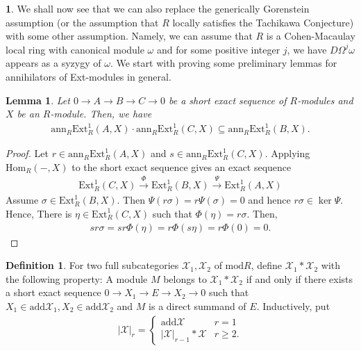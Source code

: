 \documentclass[12pt]{amsart}
\newcommand{\Ext}{\mathrm{Ext}}
\newcommand{\Hom}{\mathrm{Hom}}
\newcommand{\ann}{\mathrm{ann}}
\newcommand{\module}{\mathrm{mod}}
\newcommand{\add}{\mathrm{add}}
\newcommand{\XX}{\mathcal{X}}
\newtheorem{lemma}[theorem]{Lemma}
\theoremstyle{definition}
\newtheorem{definition}[theorem]{Definition}
\newtheorem{chunk}[theorem]{}
\numberwithin{equation}{theorem}
\def\X{\mathcal{X}}
\begin{document}
\begin{chunk}
    We shall now see that we can also replace the generically Gorenstein assumption (or the assumption that $R$ locally satisfies the Tachikawa Conjecture) with some other assumption. Namely, we can assume that $R$ is a Cohen-Macaulay local ring with canonical module $\omega$ and for some positive integer $j$, we have $D \Omega^j \omega$ appears as a syzygy of $\omega$. We start with proving some preliminary lemmas for annihilators of Ext-modules in general. 
    \begin{lemma}\label{general-lemma-for-annihilators}
        Let $0 \to A \to B \to C \to 0$ be a short exact sequence of $R$-modules and $X$ be an $R$-module. Then, we have
        \begin{align*}
            \ann_R\Ext_R^1(A,X) \cdot \ann_R\Ext_R^1(C,X) \subseteq \ann_R\Ext_R^1(B,X).
        \end{align*}
    \end{lemma}
    \begin{proof}
            Let $r\in \ann_R\Ext_R^1(A,X)$ and $s \in \ann_R\Ext_R^1(C,X)$. Applying $\Hom_R(-,X)$ to the short exact sequence gives an exact sequence
            \begin{align*}
                \Ext_R^1(C,X) \xrightarrow{\Phi} \Ext_R^1(B,X) \xrightarrow{\Psi} \Ext_R^1(A,X) 
            \end{align*}
            Assume $\sigma \in \Ext_R^1(B,X)$. Then $\Psi(r \sigma) = r\Psi(\sigma) =0$ and hence $r\sigma \in \ker \Psi $. Hence, There is $\eta \in \Ext_R^1(C,X)$ such that $\Phi(\eta) = r\sigma$. Then,
            \begin{align*}
                sr\sigma = sr\Phi(\eta) = r\Phi(s \eta) = r\Phi(0)=0.
            \end{align*}
    \end{proof}
    \begin{definition}\cite[Definition 5.1]{Dao-Takahashi}
        For two full subcategories $\XX_1, \XX_2$ of $\module R$, define $\XX_1 \ast \XX_2 $ with the following property: A module $M$ belongs to $\XX_1 \ast \XX_2$ if and only if there exists a short exact sequence $0 \to X_1 \to E \to X_2 \to 0$ such that $X_1 \in \add \XX_1, X_2 \in \add \X_2$ and $M$ is a direct summand of $E$. Inductively, put
        \begin{align*}
            |\XX |_r= \begin{cases}
                \add \XX & r = 1 \\
                |\XX|_{r-1} \ast \XX & r \geq 2. 
            \end{cases}

\end{align*}
\end{definition}
\end{chunk}
\end{document}
